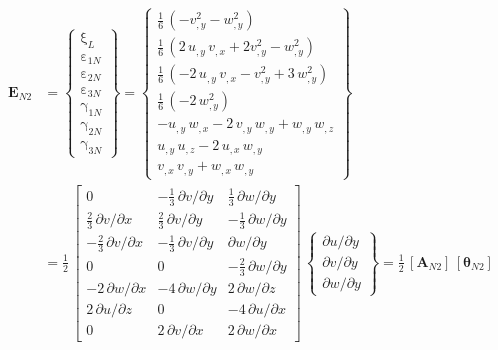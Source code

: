 \begin{equation}
\begin{aligned}
\mathbf{E}_{N2} & =  \begin{Bmatrix}
\mathrm \xi_{L} \\
\mathrm \varepsilon_{1N} \\
\mathrm \varepsilon_{2N} \\
\mathrm \varepsilon_{3N} \\
\mathrm \gamma_{1N} \\
\mathrm \gamma_{2N} \\
\mathrm \gamma_{3N} \end{Bmatrix} =
\begin{Bmatrix}
\tfrac{1}{6} \,  \left( - v_{,y}^2 - w_{,y}^2  \right)\\
\tfrac{1}{6} \,  \left( 2 \, u_{,y} \, v_{,x} + 2 v_{,y}^2 -  w_{,y}^2 \right) \\
\tfrac{1}{6} \,  \left( - 2 \, u_{,y} \, v_{,x} - v_{,y}^2 + 3 \, w_{,y}^2 \right) \\
\tfrac{1}{6} \,  \left(-2 \, w_{,y}^2 \right) \\ 
- u_{,y} \, w_{,x} - 2 \, v_{,y} \, w_{,y} + w_{,y} \, w_{,z} \\
u_{,y} \, u_{,z} - 2 \, u_{,x} \, w_{,y} \\ 
 v_{,x} \, v_{,y}  + w_{,x} \, w_{,y} \end{Bmatrix} \\
& = \frac{1}{2} \, \begin{bmatrix}
0 &  - \tfrac{1}{3} \, \partial v / \partial y & \tfrac{1}{3} \, \partial w / \partial y  \\
\tfrac{2}{3} \, \partial v / \partial x &  \tfrac{2}{3} \, \partial v / \partial y & - \tfrac{1}{3} \, \partial w / \partial y  \\
-\tfrac{2}{3} \, \partial v / \partial x  & -\tfrac{1}{3} \, \partial v / \partial y & \partial w / \partial y \\
0 & 0 & - \tfrac{2}{3} \, \partial w / \partial y   \\
- 2 \, \partial w / \partial x &  - 4 \, \partial w / \partial y & 2 \,  \partial w / \partial z  \\
2 \, \partial u / \partial z &  0 & - 4 \, \partial u / \partial x  \\
0 &  2 \, \partial v / \partial x &  2 \, \partial w / \partial x  \end{bmatrix} \, \begin{Bmatrix}
\partial u / \partial y\\
\partial v / \partial y \\
\partial w / \partial y
\end{Bmatrix}
= \tfrac{1}{2} \, [\mathbf{A}_{N2}] \, [\boldsymbol{\theta}_{N2}]
\end{aligned}
\end{equation}
